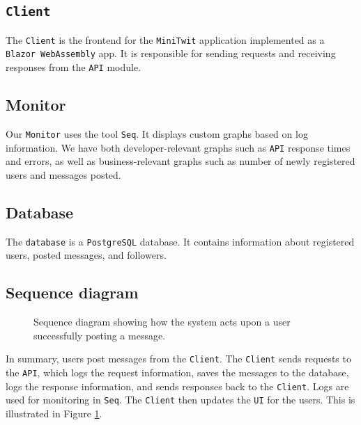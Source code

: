 \subsection{\texttt{Client}}

The \texttt{Client} is the frontend for the \texttt{MiniTwit} 
application implemented as a \texttt{Blazor WebAssembly} app. 
It is responsible for sending requests and 
receiving responses from the \texttt{API} module.

\subsection{Monitor}

Our \texttt{Monitor} uses the tool \texttt{Seq}\cite{seq}.
It displays custom graphs based on log information. 
We have both developer-relevant 
graphs such as \texttt{API} response times and errors,
as well as business-relevant graphs such as number 
of newly registered users and messages posted.

\subsection{Database}

The \texttt{database} is a \texttt{PostgreSQL}\cite{postgres} database.
It contains information about registered users,
posted messages, and followers.

\subsection{Sequence diagram}
\begin{figure}[H]
    \centering
    \caption{Sequence diagram showing how the system acts upon 
    a user successfully posting a message.}
    \label{fig:seq_diagram}
\end{figure}
In summary, users post messages from the \texttt{Client}.
The \texttt{Client} sends requests to the \texttt{API}, 
which logs the request information, saves the messages to the 
database, logs the response information, and sends responses 
back to the \texttt{Client}. Logs are used for monitoring in 
\texttt{Seq}. The \texttt{Client} then updates the 
\texttt{UI} for the users. This is illustrated in 
Figure \ref{fig:seq_diagram}.

